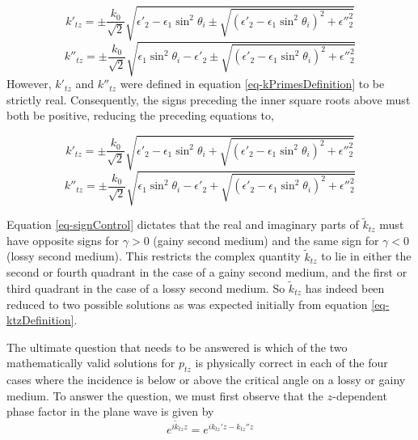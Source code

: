 \documentclass[12pt]{uthesis-v12}
\begin{document}
\begin{equation}
k'_{tz}=\pm \frac{k_0}{\sqrt{2}}\sqrt{\epsilon'_2-\epsilon_1\sin^2\theta_i \pm \sqrt{(\epsilon'_2-\epsilon_1\sin^2\theta_i)^2+\epsilon''^2_2}}
\end{equation}
\begin{equation}
k''_{tz}=\pm \frac{k_0}{\sqrt{2}}\sqrt{\epsilon_1\sin^2\theta_i-\epsilon'_2 \pm \sqrt{(\epsilon'_2-\epsilon_1\sin^2\theta_i)^2+\epsilon''^2_2}}
\end{equation}
However, $k'_{tz}$ and $k''_{tz}$ were defined in equation \ref{eq-kPrimesDefinition} to be strictly real. Consequently, the signs preceding the inner square roots above must both be positive, reducing the preceding equations to,

\begin{equation}\label{eq-ktz'Solution}
k'_{tz}=\pm \frac{k_0}{\sqrt{2}}\sqrt{\epsilon'_2-\epsilon_1\sin^2\theta_i+\sqrt{(\epsilon'_2-\epsilon_1\sin^2\theta_i)^2+\epsilon''^2_2}}
\end{equation}
\begin{equation}\label{eq-ktz''Solution}
k''_{tz}=\pm \frac{k_0}{\sqrt{2}}\sqrt{\epsilon_1\sin^2\theta_i-\epsilon'_2+\sqrt{(\epsilon'_2-\epsilon_1\sin^2\theta_i)^2+\epsilon''^2_2}}
\end{equation}

Equation \ref{eq-signControl} dictates that the real and imaginary parts of $\tilde{k}_{tz}$ must have opposite signs for $\gamma > 0$ (gainy second medium) and the same sign for $\gamma < 0$ (lossy second medium). This restricts the complex quantity $\tilde{k}_{tz}$ to lie in either the second or fourth quadrant in the case of a gainy second medium, and the first or third quadrant in the case of a lossy second medium. So $\tilde{k}_{tz}$ has indeed been reduced to two possible solutions as was expected initially from equation \ref{eq-ktzDefinition}.

The ultimate question that needs to be answered is which of the two mathematically valid solutions for $p_{tz}$ is physically correct in each of the four cases where the incidence is below or above the critical angle on a lossy or gainy medium. To answer the question, we must first observe that the $z$-dependent phase factor in the plane wave is given by
\begin{equation}\label{eq-phaseFactor}
e^{i\tilde{k}_{tz}z}=e^{ik_{tz}'z-k_{tz}''z}
\end{equation}
\end{document}
